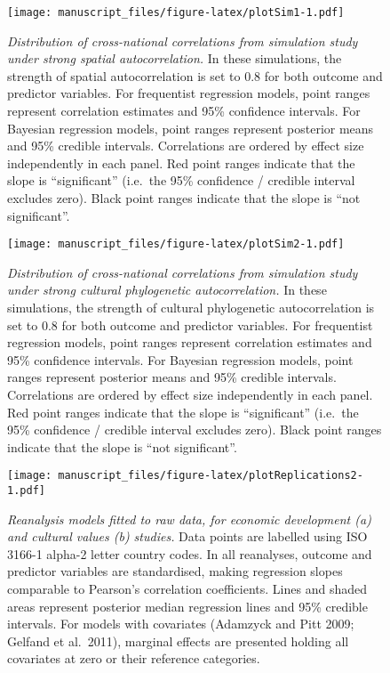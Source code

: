 \documentclass[english,man,floatsintext]{apa6}
\begin{document}
\newpage



\begin{figure}
\centering
\texttt{[image: manuscript\_files/figure-latex/plotSim1-1.pdf]}
\caption{\label{fig:plotSim1}\emph{Distribution of cross-national correlations from simulation study under strong spatial autocorrelation.} In these simulations, the strength of spatial autocorrelation is set to 0.8 for both outcome and predictor variables. For frequentist regression models, point ranges represent correlation estimates and 95\% confidence intervals. For Bayesian regression models, point ranges represent posterior means and 95\% credible intervals. Correlations are ordered by effect size independently in each panel. Red point ranges indicate that the slope is \enquote{significant} (i.e.~the 95\% confidence / credible interval excludes zero). Black point ranges indicate that the slope is \enquote{not significant}.}
\end{figure}

\newpage



\begin{figure}
\centering
\texttt{[image: manuscript\_files/figure-latex/plotSim2-1.pdf]}
\caption{\label{fig:plotSim2}\emph{Distribution of cross-national correlations from simulation study under strong cultural phylogenetic autocorrelation.} In these simulations, the strength of cultural phylogenetic autocorrelation is set to 0.8 for both outcome and predictor variables. For frequentist regression models, point ranges represent correlation estimates and 95\% confidence intervals. For Bayesian regression models, point ranges represent posterior means and 95\% credible intervals. Correlations are ordered by effect size independently in each panel. Red point ranges indicate that the slope is \enquote{significant} (i.e.~the 95\% confidence / credible interval excludes zero). Black point ranges indicate that the slope is \enquote{not significant}.}
\end{figure}

\newpage



\begin{figure}
\centering
\texttt{[image: manuscript\_files/figure-latex/plotReplications2-1.pdf]}
\caption{\label{fig:plotReplications2}\emph{Reanalysis models fitted to raw data, for economic development (a) and cultural values (b) studies.} Data points are labelled using ISO 3166-1 alpha-2 letter country codes. In all reanalyses, outcome and predictor variables are standardised, making regression slopes comparable to Pearson's correlation coefficients. Lines and shaded areas represent posterior median regression lines and 95\% credible intervals. For models with covariates (Adamzyck and Pitt 2009; Gelfand et al.~2011), marginal effects are presented holding all covariates at zero or their reference categories.}
\end{figure}
\end{document}
